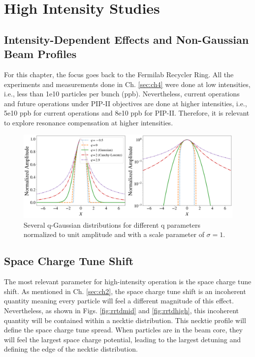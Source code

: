 \chapter{High Intensity Studies}
\label{sec:ch6}

\section{Intensity-Dependent Effects and Non-Gaussian Beam Profiles}

For this chapter, the focus goes back to the Fermilab Recycler Ring. All the experiments and measurements done in Ch. \ref{sec:ch4} were done at low intensities, i.e., less than 1e10 particles per bunch (ppb). Nevertheless, current operations and future operations under PIP-II objectives are done at higher intensities, i.e., 5e10 ppb for current operations and 8e10 ppb for PIP-II. Therefore, it is relevant to explore resonance compensation at higher intensities. 

\cite{qgaussian}

\begin{figure}[H]
    \centering
    \includegraphics[width=\textwidth,keepaspectratio]{chapter6/qgaussians.png}
    \caption{Several q-Gaussian distributions for different q parameters normalized to unit amplitude and with a scale parameter of $\sigma=1$.}
    \label{fig:qgaussians}
\end{figure}

\section{Space Charge Tune Shift}

The most relevant parameter for high-intensity operation is the space charge tune shift. As mentioned in Ch. \ref{sec:ch2}, the space charge tune shift is an incoherent quantity meaning every particle will feel a different magnitude of this effect. Nevertheless, as shown in Figs. \ref{fig:rrtdmid} and \ref{fig:rrtdhigh}, this incoherent quantity will be contained within a necktie distribution. This necktie profile will define the space charge tune spread. When particles are in the beam core, they will feel the largest space charge potential, leading to the largest detuning and defining the edge of the necktie distribution.

